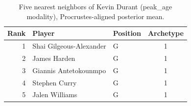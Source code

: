 \begin{table}[htbp]
  \centering\small
  \begin{tabular}{rllc}
    \toprule
    Rank & Player & Position & Archetype \\
    \midrule
    1 & Shai Gilgeous-Alexander & G & 1 \\
    2 & James Harden & G & 1 \\
    3 & Giannis Antetokounmpo & G & 1 \\
    4 & Stephen Curry & G & 1 \\
    5 & Jalen Williams & G & 1 \\
    \bottomrule
  \end{tabular}
  \caption{Five nearest neighbors of Kevin Durant (peak_age modality), Procrustes-aligned posterior mean.}
  \label{tab:Kevin_Durant_neighbors_peak_age}
\end{table}

